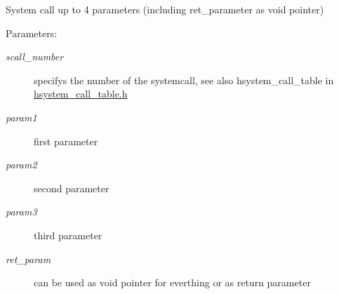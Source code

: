 System call up to 4 parameters (including ret\_\-parameter as void pointer) \begin{Desc}
\item[Parameters:]
\begin{description}
\item[{\em scall\_\-number}]specifys the number of the systemcall, see also hsystem\_\-call\_\-table in \hyperlink{hsystem__call__table_8h}{hsystem\_\-call\_\-table.h} \item[{\em param1}]first parameter \item[{\em param2}]second parameter \item[{\em param3}]third parameter \item[{\em ret\_\-param}]can be used as void pointer for everthing or as return parameter \end{description}
\end{Desc}
